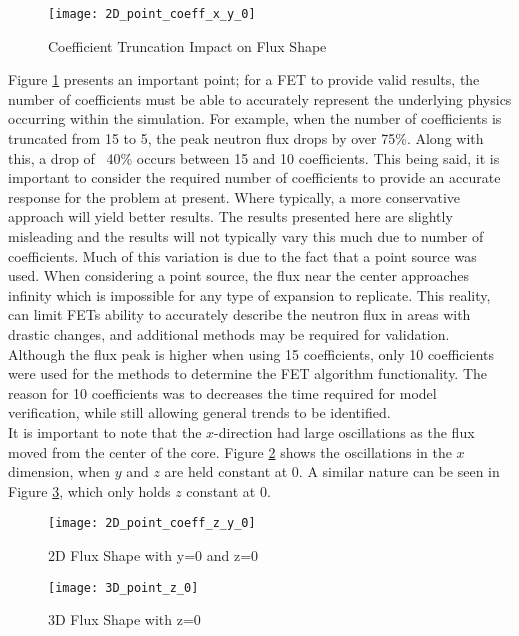 \documentclass[10tma4paper]{article}
\begin{document}
\begin{figure}[H]
	\caption{Coefficient Truncation Impact on Flux Shape}
	\begin{center}
		\texttt{[image: 2D\_point\_coeff\_x\_y\_0]}
	\end{center}
	\label{2Dcoefficients}
\end{figure}
\noindent Figure \ref{2Dcoefficients} presents an important point; for a FET to provide valid results, the number of coefficients must be able to accurately represent the underlying physics occurring within the simulation. For example, when the number of coefficients is truncated from 15 to 5, the peak neutron flux drops by over 75\%. Along with this, a drop of ~40\% occurs between 15 and 10 coefficients. This being said, it is important to consider the required number of coefficients to provide an accurate response for the problem at present. Where typically, a more conservative approach will yield better results. The results presented here are slightly misleading and the results will not typically vary this much due to number of coefficients. Much of this variation is due to the fact that a point source was used. When considering a point source, the flux near the center approaches infinity which is impossible for any type of expansion to replicate. This reality, can limit FETs ability to accurately describe the neutron flux in areas with drastic changes, and additional methods may be required for validation. 
\\
Although the flux peak is higher when using 15 coefficients, only 10 coefficients were used for the methods to determine the FET algorithm functionality. The reason for 10 coefficients was to decreases the time required for model verification, while still allowing general trends to be identified.
\\
It is important to note that the $x$-direction had large oscillations as the flux moved from the center of the core. Figure \ref{2Dcoefficientsx} shows the oscillations in the $x$ dimension, when $y$ and $z$ are held constant at 0. A similar nature can be seen in Figure \ref{3Dcoefficientsx}, which only holds $z$ constant at 0.
\begin{figure}[H]
	\caption{2D Flux Shape with y=0 and z=0}
	\begin{center}
		\texttt{[image: 2D\_point\_coeff\_z\_y\_0]}
	\end{center}
	\label{2Dcoefficientsx}
\end{figure}
\begin{figure}[H]
	\caption{3D Flux Shape with z=0}
	\begin{center}
		\texttt{[image: 3D\_point\_z\_0]}
	\end{center}
	\label{3Dcoefficientsx}
\end{figure}
\end{document}
